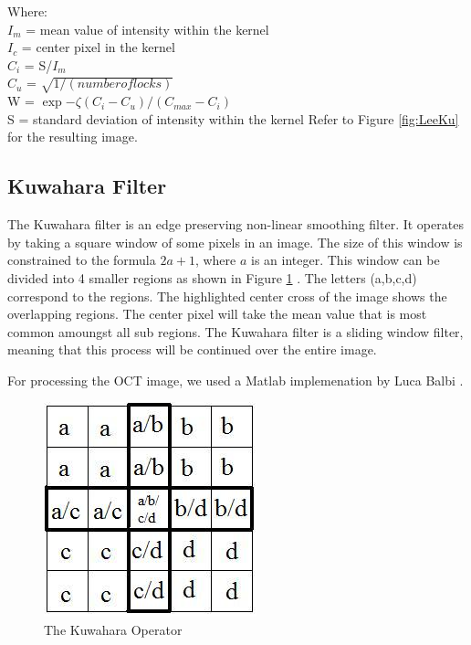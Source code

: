 \documentclass[%
reprint,
showpacs,preprintnumbers,
bibnotes,
amsmath,amssymb,
aps,
pra,
]{revtex4-1}
\begin{document}
Where:
\\
	$I_{m}$ = mean value of intensity within the kernel
	\\
	$I_{c}$ = center pixel in the kernel
	\\
	$C_{i}$ = S/$I_{m}$
	\\
	$C_{u}$ = $\sqrt{1/(number of locks)}$
	\\
	W				= $\exp{-\zeta(C_{i}-C_{u})/(C_{max}-C_{i})}$
	\\
	S       = standard deviation of intensity within the kernel
	\cite{radarlee}
  Refer to Figure \ref{fig:LeeKu} for the resulting image.
\subsection{\label{sec:level2} Kuwahara Filter}

The Kuwahara filter is an edge preserving non-linear smoothing filter. It operates by taking a square window of some pixels in an image. The size of this window is constrained to the formula $2a + 1$, where $a$ is an integer. This window can be divided into 4 smaller regions as shown in Figure \ref{fig:kusquares} \cite{Papari_2007}. The letters (a,b,c,d) correspond to the regions. The highlighted center cross of the image shows the overlapping regions. The center pixel will take the mean value that is most common amoungst all sub regions. The Kuwahara filter is a sliding window filter, meaning that this process will be continued over the entire image.

For processing the OCT image, we used a Matlab implemenation by Luca Balbi \cite{balbi_faster}.
\begin{figure}
  \centering
  \includegraphics[width=0.8\linewidth]{Figures/kusquares}
  \caption{The Kuwahara Operator \cite{kuwahara_operator}}
  \label{fig:kusquares}
\end{figure}
\end{document}
